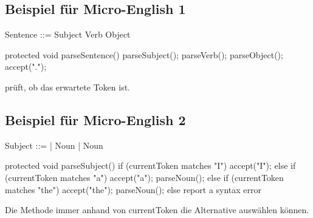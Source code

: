 \subsection{Beispiel für Micro-English 1}
\begin{defBox}
    Sentence ::= Subject Verb Object 
\end{defBox}
\begin{codeBlock}{}
    protected void parseSentence(){
        parseSubject();
        parseVerb();
        parseObject();
        accept(".");
    }
\end{codeBlock}
\begin{defBox}
     prüft, ob  das erwartete Token  ist.
\end{defBox}

\subsection{Beispiel für Micro-English 2}
\begin{defBox}
    Subject ::=  |  Noun |  Noun
\end{defBox}
\begin{codeBlock}{}
    protected void parseSubject(){
        if (currentToken matches "I"){
            accept("I");
        } else if (currentToken matches "a"){
            accept("a");
            parseNoun();
        } else if (currentToken matches "the"){
            accept("the");
            parseNoun();
        } else 
            report a syntax error
    }
\end{codeBlock}
\begin{defBox}
    Die Methode  immer anhand von currentToken die  Alternative auswählen können.
\end{defBox}

